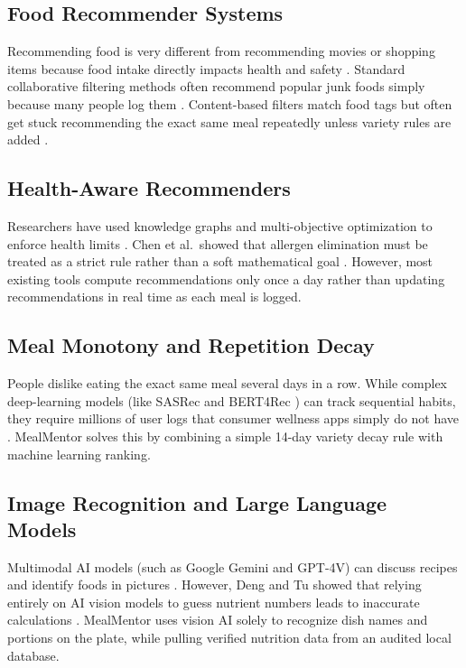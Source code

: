 \documentclass[10pt, conference, letterpaper]{IEEEtran}
\begin{document}
\subsection{Food Recommender Systems}
Recommending food is very different from recommending movies or shopping items because food intake directly impacts health and safety \cite{bondevik2024, guo2023}. Standard collaborative filtering methods often recommend popular junk foods simply because many people log them \cite{rendle2010}. Content-based filters match food tags but often get stuck recommending the exact same meal repeatedly unless variety rules are added \cite{bondevik2024}.

\subsection{Health-Aware Recommenders}
Researchers have used knowledge graphs and multi-objective optimization to enforce health limits \cite{chen2021, guo2023}. Chen et al.\ showed that allergen elimination must be treated as a strict rule rather than a soft mathematical goal \cite{chen2021}. However, most existing tools compute recommendations only once a day rather than updating recommendations in real time as each meal is logged.

\subsection{Meal Monotony and Repetition Decay}
People dislike eating the exact same meal several days in a row. While complex deep-learning models (like SASRec \cite{kang2018} and BERT4Rec \cite{sun2019}) can track sequential habits, they require millions of user logs that consumer wellness apps simply do not have \cite{rostami2022}. MealMentor solves this by combining a simple 14-day variety decay rule with machine learning ranking.

\subsection{Image Recognition and Large Language Models}
Multimodal AI models (such as Google Gemini and GPT-4V) can discuss recipes and identify foods in pictures \cite{deng2026}. However, Deng and Tu showed that relying entirely on AI vision models to guess nutrient numbers leads to inaccurate calculations \cite{deng2026}. MealMentor uses vision AI solely to recognize dish names and portions on the plate, while pulling verified nutrition data from an audited local database.
\end{document}
